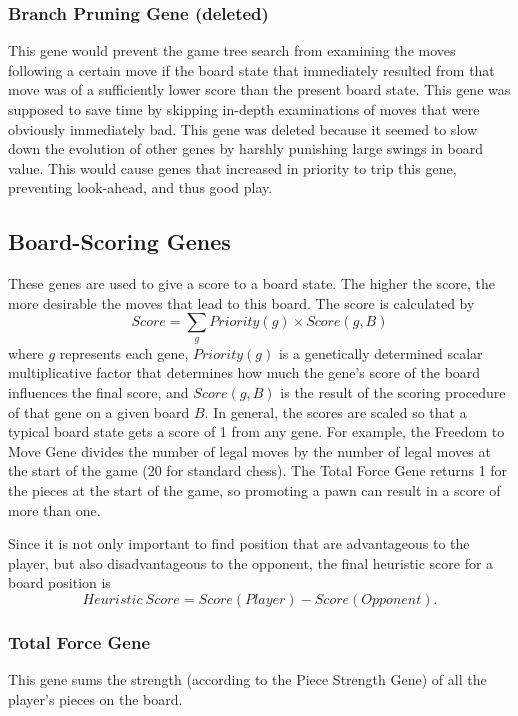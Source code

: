 \documentclass[letterpaper]{article}
\renewcommand\_{\textunderscore\allowbreak}
\begin{document}
\subsubsection{Branch Pruning Gene (deleted)}

This gene would prevent the game tree search from examining the moves following a certain move if the board state that immediately resulted from that move was of a sufficiently lower score than the present board state. This gene was supposed to save time by skipping in-depth examinations of moves that were obviously immediately bad. This gene was deleted because it seemed to slow down the evolution of other genes by harshly punishing large swings in board value. This would cause genes that increased in priority to trip this gene, preventing look-ahead, and thus good play.

\subsection{Board-Scoring Genes}
These genes are used to give a score to a board state. The higher the score, the more desirable the moves that lead to this board. The score is calculated by
\[Score = \sum_g Priority(g) \times Score(g,B)\]
where \(g\) represents each gene, \(Priority(g)\) is a genetically determined scalar multiplicative factor that determines how much the gene's score of the board influences the final score, and \(Score(g,B)\) is the result of the scoring procedure of that gene on a given board \(B\). In general, the scores are scaled so that a typical board state gets a score of 1 from any gene. For example, the Freedom to Move Gene divides the number of legal moves by the number of legal moves at the start of the game (20 for standard chess). The Total Force Gene returns 1 for the pieces at the start of the game, so promoting a pawn can result in a score of more than one.

Since it is not only important to find position that are advantageous to the player, but also disadvantageous to the opponent, the final heuristic score for a board position is
\[Heuristic\ Score = Score(Player) - Score(Opponent).\]

\subsubsection{Total Force Gene}
\label{total-force}
This gene sums the strength (according to the Piece Strength Gene) of all the player's pieces on the board.
\end{document}

